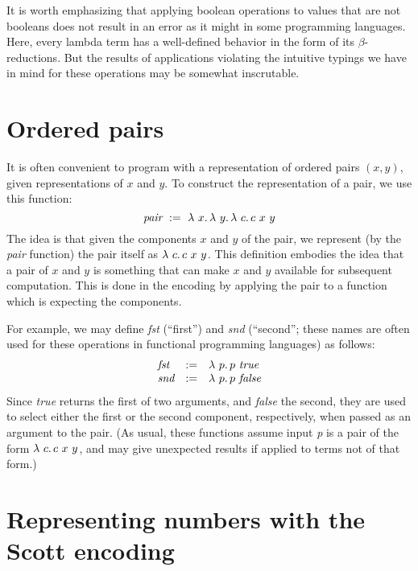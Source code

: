 It is worth emphasizing that applying boolean operations to values
that are not booleans does not result in an error as it might
in some programming languages.  Here, every lambda term has a well-defined
behavior in the form of its $\beta$-reductions.  But the results of
applications violating the intuitive typings we have in mind for
these operations may be somewhat inscrutable.

\section{Ordered pairs}

It is often convenient to program with a representation of ordered pairs $(x,y)$, given representations of $x$ and $y$.
To construct the representation of a pair, we use this function:
\[
\textit{pair} \ :=\ \lam{x}{\lam{y}{\lam{c}{c\ x\ y}}}
\]
\noindent The idea is that given the components $x$ and $y$ of the
pair, we represent (by the \textit{pair} function) the pair itself as
$\lam{c}{c\ x\ y}$.  This definition embodies the idea that a pair of
$x$ and $y$ is something that can make $x$ and $y$ available for
subsequent computation.  This is done in the encoding by applying the
pair to a function which is expecting the components.

For example, we may define \textit{fst} (``first'') and \textit{snd}
(``second''; these names are often used for these operations in
functional programming languages) as follows:
\[
\begin{array}{lll}
  \textit{fst} & := & \lambda\ p.\, p\ \textit{true} \\
  \textit{snd} & := & \lambda\ p.\, p\ \textit{false}
\end{array}
\]
\noindent Since \textit{true} returns the first of two arguments, and
\textit{false} the second, they are used to select either the first or
the second component, respectively, when passed as an argument to the
pair.  (As usual, these functions assume input \textit{p} is a pair
of the form $\lam{c}{c\ x\ y}$, and may give unexpected results
if applied to terms not of that form.)

\section{Representing numbers with the Scott encoding}

